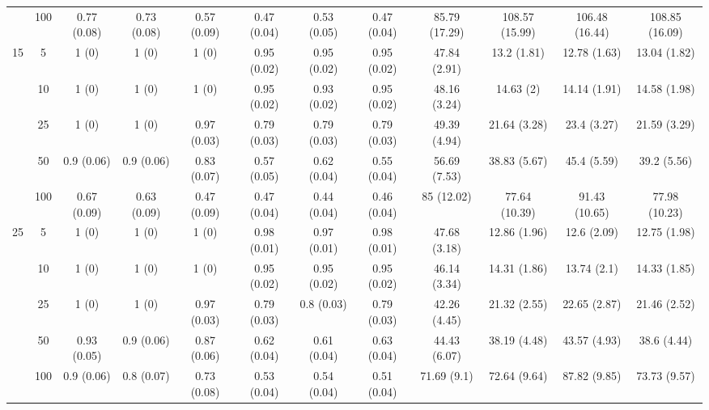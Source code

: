 \documentclass[11pt]{article}
\theoremstyle{definition}
\begin{document}
\begin{landscape}
\begin{table}[b]
\begin{center}
{\begin{tabular}{cc|ccc|ccc|cccc|}
  & 100  & 0.77 (0.08) & 0.73 (0.08) & 0.57 (0.09) & 0.47 (0.04) & 0.53 (0.05) & 0.47 (0.04) & 85.79 (17.29) & 108.57 (15.99) & 106.48 (16.44) & 108.85 (16.09) \\[.3cm] 
 \multirow{5}{*}{15} & 5  & 1 (0) & 1 (0) & 1 (0) & 0.95 (0.02) & 0.95 (0.02) & 0.95 (0.02) & 47.84 (2.91) & 13.2 (1.81) & 12.78 (1.63) & 13.04 (1.82) \\ 
  & 10  & 1 (0) & 1 (0) & 1 (0) & 0.95 (0.02) & 0.93 (0.02) & 0.95 (0.02) & 48.16 (3.24) & 14.63 (2) & 14.14 (1.91) & 14.58 (1.98) \\ 
  & 25  & 1 (0) & 1 (0) & 0.97 (0.03) & 0.79 (0.03) & 0.79 (0.03) & 0.79 (0.03) & 49.39 (4.94) & 21.64 (3.28) & 23.4 (3.27) & 21.59 (3.29) \\ 
  & 50  & 0.9 (0.06) & 0.9 (0.06) & 0.83 (0.07) & 0.57 (0.05) & 0.62 (0.04) & 0.55 (0.04) & 56.69 (7.53) & 38.83 (5.67) & 45.4 (5.59) & 39.2 (5.56) \\ 
  & 100  & 0.67 (0.09) & 0.63 (0.09) & 0.47 (0.09) & 0.47 (0.04) & 0.44 (0.04) & 0.46 (0.04) & 85 (12.02) & 77.64 (10.39) & 91.43 (10.65) & 77.98 (10.23) \\[.3cm] 
 \multirow{5}{*}{25} & 5  & 1 (0) & 1 (0) & 1 (0) & 0.98 (0.01) & 0.97 (0.01) & 0.98 (0.01) & 47.68 (3.18) & 12.86 (1.96) & 12.6 (2.09) & 12.75 (1.98) \\ 
  & 10  & 1 (0) & 1 (0) & 1 (0) & 0.95 (0.02) & 0.95 (0.02) & 0.95 (0.02) & 46.14 (3.34) & 14.31 (1.86) & 13.74 (2.1) & 14.33 (1.85) \\ 
  & 25  & 1 (0) & 1 (0) & 0.97 (0.03) & 0.79 (0.03) & 0.8 (0.03) & 0.79 (0.03) & 42.26 (4.45) & 21.32 (2.55) & 22.65 (2.87) & 21.46 (2.52) \\ 
  & 50  & 0.93 (0.05) & 0.9 (0.06) & 0.87 (0.06) & 0.62 (0.04) & 0.61 (0.04) & 0.63 (0.04) & 44.43 (6.07) & 38.19 (4.48) & 43.57 (4.93) & 38.6 (4.44) \\ 
  & 100  & 0.9 (0.06) & 0.8 (0.07) & 0.73 (0.08) & 0.53 (0.04) & 0.54 (0.04) & 0.51 (0.04) & 71.69 (9.1) & 72.64 (9.64) & 87.82 (9.85) & 73.73 (9.57) \\  
\end{tabular}}
   \end{center}
\end{table}
\end{landscape}
\end{document}
